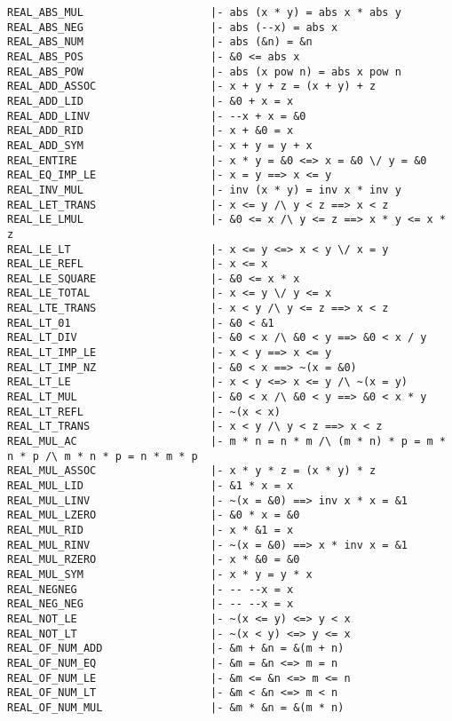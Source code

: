 \documentclass{llncs}
\begin{document}
\begingroup
\scriptsize
\begin{verbatim}
REAL_ABS_MUL                    |- abs (x * y) = abs x * abs y
REAL_ABS_NEG                    |- abs (--x) = abs x
REAL_ABS_NUM                    |- abs (&n) = &n
REAL_ABS_POS                    |- &0 <= abs x
REAL_ABS_POW                    |- abs (x pow n) = abs x pow n
REAL_ADD_ASSOC                  |- x + y + z = (x + y) + z
REAL_ADD_LID                    |- &0 + x = x
REAL_ADD_LINV                   |- --x + x = &0
REAL_ADD_RID                    |- x + &0 = x
REAL_ADD_SYM                    |- x + y = y + x
REAL_ENTIRE                     |- x * y = &0 <=> x = &0 \/ y = &0
REAL_EQ_IMP_LE                  |- x = y ==> x <= y
REAL_INV_MUL                    |- inv (x * y) = inv x * inv y
REAL_LET_TRANS                  |- x <= y /\ y < z ==> x < z
REAL_LE_LMUL                    |- &0 <= x /\ y <= z ==> x * y <= x * z
REAL_LE_LT                      |- x <= y <=> x < y \/ x = y
REAL_LE_REFL                    |- x <= x
REAL_LE_SQUARE                  |- &0 <= x * x
REAL_LE_TOTAL                   |- x <= y \/ y <= x
REAL_LTE_TRANS                  |- x < y /\ y <= z ==> x < z
REAL_LT_01                      |- &0 < &1
REAL_LT_DIV                     |- &0 < x /\ &0 < y ==> &0 < x / y
REAL_LT_IMP_LE                  |- x < y ==> x <= y
REAL_LT_IMP_NZ                  |- &0 < x ==> ~(x = &0)
REAL_LT_LE                      |- x < y <=> x <= y /\ ~(x = y)
REAL_LT_MUL                     |- &0 < x /\ &0 < y ==> &0 < x * y
REAL_LT_REFL                    |- ~(x < x)
REAL_LT_TRANS                   |- x < y /\ y < z ==> x < z
REAL_MUL_AC                     |- m * n = n * m /\ (m * n) * p = m * n * p /\ m * n * p = n * m * p
REAL_MUL_ASSOC                  |- x * y * z = (x * y) * z
REAL_MUL_LID                    |- &1 * x = x
REAL_MUL_LINV                   |- ~(x = &0) ==> inv x * x = &1
REAL_MUL_LZERO                  |- &0 * x = &0
REAL_MUL_RID                    |- x * &1 = x
REAL_MUL_RINV                   |- ~(x = &0) ==> x * inv x = &1
REAL_MUL_RZERO                  |- x * &0 = &0
REAL_MUL_SYM                    |- x * y = y * x
REAL_NEGNEG                     |- -- --x = x
REAL_NEG_NEG                    |- -- --x = x
REAL_NOT_LE                     |- ~(x <= y) <=> y < x
REAL_NOT_LT                     |- ~(x < y) <=> y <= x
REAL_OF_NUM_ADD                 |- &m + &n = &(m + n)
REAL_OF_NUM_EQ                  |- &m = &n <=> m = n
REAL_OF_NUM_LE                  |- &m <= &n <=> m <= n
REAL_OF_NUM_LT                  |- &m < &n <=> m < n
REAL_OF_NUM_MUL                 |- &m * &n = &(m * n)

\end{verbatim}
\end{document}
